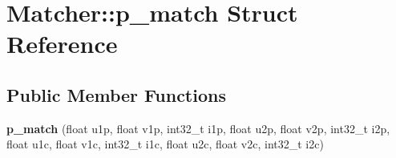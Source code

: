 \hypertarget{struct_matcher_1_1p__match}{\section{Matcher\+:\+:p\+\_\+match Struct Reference}
\label{struct_matcher_1_1p__match}
}
\subsection*{Public Member Functions}
\begin{DoxyCompactItemize}
\item 
\hypertarget{struct_matcher_1_1p__match_a10f3b3ea9ffe5d8275001295616a887a}{{\bfseries p\+\_\+match} (float u1p, float v1p, int32\+\_\+t i1p, float u2p, float v2p, int32\+\_\+t i2p, float u1c, float v1c, int32\+\_\+t i1c, float u2c, float v2c, int32\+\_\+t i2c)}\label{struct_matcher_1_1p__match_a10f3b3ea9ffe5d8275001295616a887a}

\end{DoxyCompactItemize}
